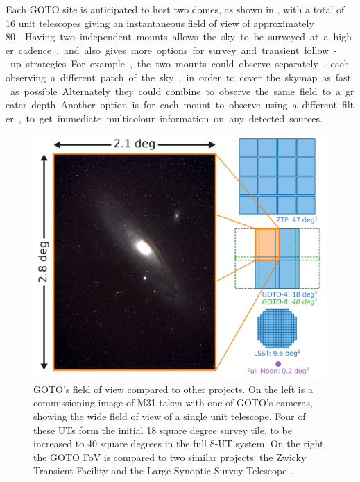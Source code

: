 \begin{colsection}
\begin{colsection}
Each GOTO site is anticipated to host two domes, as shown in , with a total of 16 unit telescopes giving an instantaneous field of view of approximately \SI{80}{\square\deg}. Having two independent mounts allows the sky to be surveyed at a higher cadence, and also gives more options for survey and transient follow-up strategies. For example, the two mounts could observe separately, each observing a different patch of the sky, in order to cover the skymap as fast as possible. Alternately they could combine to observe the same field to a greater depth. Another option is for each mount to observe using a different filter, to get immediate multicolour information on any detected sources.

\begin{figure}[p]
    \begin{center}
        \includegraphics[width=\linewidth]{images/fov.pdf}
    \end{center}
    \caption[GOTO's field of view compared to other projects]{
        GOTO's field of view compared to other projects. On the left is a commissioning image of M31 taken with one of GOTO's cameras, showing the wide field of view of a single unit telescope. Four of these UTs form the initial 18 square degree survey tile, to be increased to 40 square degrees in the full 8-UT system. On the right the GOTO FoV is compared to two similar projects: the Zwicky Transient Facility  \citep[ZTF,][]{ZTF} and the Large Synoptic Survey Telescope  \citep[LSST,][]{LSST}.
    }\label{fig:fov}
\end{figure}


\end{colsection}
\end{colsection}
